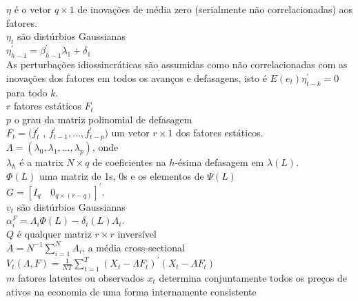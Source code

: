 \documentclass[12pt]{article}
\begin{document}
 $\eta$ é o vetor $q \times 1$ de inovações de média zero (serialmente não correlacionadas) aos fatores. 
 \\
 
 $\eta_t$ são distúrbios Gaussianas
 \\
 
$\eta^{\prime}_{h-1} = \beta^{\prime}_{h-1} \lambda_1 + \delta_1$
\\

 As perturbações idiossincráticas são assumidas como não correlacionadas com as inovações dos fatores em todos os avanços e defasagens, isto é $E(e_t) \eta^{\prime}_{t-k} = 0$ para todo $k$. 
\\

$r$ fatores estáticos $F_t$ 
\\

 $p$ o grau da matriz polinomial de defasagem
\\

 $F_t = (f^{\prime}_{t}$ , $f^{\prime}_{t-1} ,...,f^{\prime}_{t-p})$ um vetor $r \times 1$ dos fatores estáticos. 
\\

 $\Lambda = (\lambda_0 , \lambda_1 ,...,  \lambda_p )$,  onde 
 \\
 
 $\lambda_h$ é a matrix $N \times q$ de coeficientes na $h$-ésima defasagem em $\lambda (L)$. 
 \\


 $\Phi (L)$ uma matriz de 1s, 0s e os elementos de $\Psi (L)$
\\

 $G = [I_q \quad 0_{q \times (r - q) } ]^{\prime}$.
\\

$v_t$ são distúrbios Gaussianas
\\

 $\alpha^F_i = \Lambda_i \Phi (L) - \delta_i (L) \Lambda_i$. 
\\

$Q$ é qualquer matriz $r \times r$ inversível
\\

 $\overline{A} = N^{-1} \sum_{i=1}^{N} A_i$, a média cross-sectional
\\

$V_t (\Lambda , F) = \frac{1}{N T} \sum_{t=1}^{T} (X_t - \Lambda F_t)^{\prime} (X_t - \Lambda F_t)$
\\

$m $ fatores latentes ou observados $x_t$ determina conjuntamente todos os preços de ativos na economia de uma forma internamente consistente
\\
\end{document}
